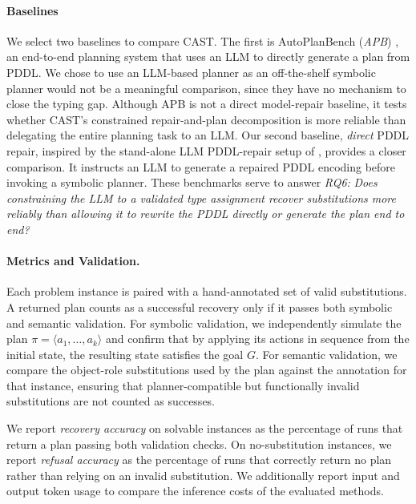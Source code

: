 \paragraph{Baselines}
We select two baselines to compare CAST. The first is AutoPlanBench (\emph{APB}) \cite{Stein_Fišer_Hoffmann_Koller_2025}, an end-to-end planning system that uses an LLM to directly generate a plan from PDDL. We chose to use an LLM-based planner as an off-the-shelf symbolic planner would not be a meaningful comparison, since they have no mechanism to close the typing gap. Although APB is not a direct model-repair baseline, it tests whether CAST's constrained repair-and-plan decomposition is more reliable than delegating the entire planning task to an LLM. 
Our second baseline, \emph{direct} PDDL repair, inspired by the stand-alone LLM PDDL-repair setup of \citet{gragera2023exploring}, provides a closer comparison. It instructs an LLM to generate a repaired PDDL encoding before invoking a symbolic planner. 
These benchmarks serve to answer \textit{RQ6:} \textit{Does constraining the LLM to a validated type assignment recover substitutions more reliably than allowing it to rewrite the PDDL directly or generate the plan end to end?}



\paragraph{Metrics and Validation.}Each problem instance is paired with a hand-annotated set of valid substitutions. A returned plan counts as a successful recovery only if it passes both symbolic and semantic validation. For symbolic validation, we independently simulate the plan $\pi=\langle a_1,\ldots,a_k\rangle$  and confirm that by applying its actions in sequence from the initial state, the resulting state satisfies the goal $G$. For semantic validation, we compare the object-role substitutions used by the plan against the annotation for that instance, ensuring that planner-compatible but functionally invalid substitutions are not counted as successes.

We report \emph{recovery accuracy} on solvable instances as the percentage of runs that return a plan passing both validation checks. On no-substitution instances, we report \emph{refusal accuracy} as the percentage of runs that correctly return no plan rather than relying on an invalid substitution. We additionally report input and output token usage to compare the inference costs of the evaluated methods.

